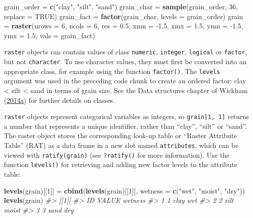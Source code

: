 \documentclass[]{krantz}
\newenvironment{Shaded}{\begin{snugshade}}{\end{snugshade}}
\newcommand{\CommentTok}[1]{\textcolor[rgb]{0.37,0.37,0.37}{\textit{#1}}}
\newcommand{\DataTypeTok}[1]{\textcolor[rgb]{0.27,0.27,0.27}{#1}}
\newcommand{\DecValTok}[1]{\textcolor[rgb]{0.06,0.06,0.06}{#1}}
\newcommand{\FloatTok}[1]{\textcolor[rgb]{0.06,0.06,0.06}{#1}}
\newcommand{\KeywordTok}[1]{\textcolor[rgb]{0.27,0.27,0.27}{\textbf{#1}}}
\newcommand{\NormalTok}[1]{#1}
\newcommand{\OtherTok}[1]{\textcolor[rgb]{0.37,0.37,0.37}{#1}}
\newcommand{\StringTok}[1]{\textcolor[rgb]{0.5,0.5,0.5}{#1}}
\let\BeginKnitrBlock\begin \let\EndKnitrBlock\end
\begin{document}
\begin{Shaded}
\begin{Highlighting}[]
\NormalTok{grain_order =}\StringTok{ }\KeywordTok{c}\NormalTok{(}\StringTok{"clay"}\NormalTok{, }\StringTok{"silt"}\NormalTok{, }\StringTok{"sand"}\NormalTok{)}
\NormalTok{grain_char =}\StringTok{ }\KeywordTok{sample}\NormalTok{(grain_order, }\DecValTok{36}\NormalTok{, }\DataTypeTok{replace =} \OtherTok{TRUE}\NormalTok{)}
\NormalTok{grain_fact =}\StringTok{ }\KeywordTok{factor}\NormalTok{(grain_char, }\DataTypeTok{levels =}\NormalTok{ grain_order)}
\NormalTok{grain =}\StringTok{ }\KeywordTok{raster}\NormalTok{(}\DataTypeTok{nrows =} \DecValTok{6}\NormalTok{, }\DataTypeTok{ncols =} \DecValTok{6}\NormalTok{, }\DataTypeTok{res =} \FloatTok{0.5}\NormalTok{, }
               \DataTypeTok{xmn =} \FloatTok{-1.5}\NormalTok{, }\DataTypeTok{xmx =} \FloatTok{1.5}\NormalTok{, }\DataTypeTok{ymn =} \FloatTok{-1.5}\NormalTok{, }\DataTypeTok{ymx =} \FloatTok{1.5}\NormalTok{,}
               \DataTypeTok{vals =}\NormalTok{ grain_fact)}
\end{Highlighting}
\end{Shaded}

\BeginKnitrBlock{rmdnote}
\texttt{raster} objects can contain values of class \texttt{numeric}, \texttt{integer}, \texttt{logical} or \texttt{factor}, but not \texttt{character}.
To use character values, they must first be converted into an appropriate class, for example using the function \texttt{factor()}.
The \texttt{levels} argument was used in the preceding code chunk to create an ordered factor:
clay \textless{} silt \textless{} sand in terms of grain size.
See the Data structures chapter of Wickham (\protect\hyperlink{ref-wickham_advanced_2014}{2014}\protect\hyperlink{ref-wickham_advanced_2014}{a}) for further details on classes.
\EndKnitrBlock{rmdnote}

\texttt{raster} objects represent categorical variables as integers, so \texttt{grain{[}1,\ 1{]}} returns a number that represents a unique identifier, rather than ``clay'', ``silt'' or ``sand''.
The raster object stores the corresponding look-up table or ``Raster Attribute Table'' (RAT) as a data frame in a new slot named \texttt{attributes}, which can be viewed with \texttt{ratify(grain)} (see \texttt{?ratify()} for more information).
Use the function \texttt{levels()} for retrieving and adding new factor levels to the attribute table:

\begin{Shaded}
\begin{Highlighting}[]
\KeywordTok{levels}\NormalTok{(grain)[[}\DecValTok{1}\NormalTok{]] =}\StringTok{ }\KeywordTok{cbind}\NormalTok{(}\KeywordTok{levels}\NormalTok{(grain)[[}\DecValTok{1}\NormalTok{]], }\DataTypeTok{wetness =} \KeywordTok{c}\NormalTok{(}\StringTok{"wet"}\NormalTok{, }\StringTok{"moist"}\NormalTok{, }\StringTok{"dry"}\NormalTok{))}
\KeywordTok{levels}\NormalTok{(grain)}
\CommentTok{#> [[1]]}
\CommentTok{#>   ID VALUE wetness}
\CommentTok{#> 1  1  clay     wet}
\CommentTok{#> 2  2  silt   moist}
\CommentTok{#> 3  3  sand     dry}
\end{Highlighting}
\end{Shaded}
\end{document}
